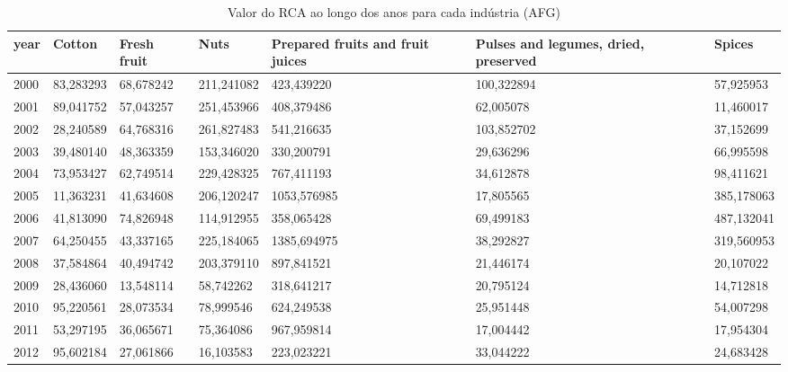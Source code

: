 \begin{table}
\centering
\caption{Valor do RCA ao longo dos anos para cada indústria (AFG)}
\begin{tabular}{p{1cm}p{2cm}p{2cm}p{2cm}p{2cm}p{2cm}p{2cm}}
\toprule
 year &     Cotton &  Fresh fruit &       Nuts &  Prepared fruits and fruit juices &  Pulses and legumes, dried, preserved &     Spices \\
\midrule
 2000 &  83,283293 &    68,678242 & 211,241082 &                        423,439220 &                            100,322894 &  57,925953 \\
 2001 &  89,041752 &    57,043257 & 251,453966 &                        408,379486 &                             62,005078 &  11,460017 \\
 2002 &  28,240589 &    64,768316 & 261,827483 &                        541,216635 &                            103,852702 &  37,152699 \\
 2003 &  39,480140 &    48,363359 & 153,346020 &                        330,200791 &                             29,636296 &  66,995598 \\
 2004 &  73,953427 &    62,749514 & 229,428325 &                        767,411193 &                             34,612878 &  98,411621 \\
 2005 &  11,363231 &    41,634608 & 206,120247 &                       1053,576985 &                             17,805565 & 385,178063 \\
 2006 &  41,813090 &    74,826948 & 114,912955 &                        358,065428 &                             69,499183 & 487,132041 \\
 2007 &  64,250455 &    43,337165 & 225,184065 &                       1385,694975 &                             38,292827 & 319,560953 \\
 2008 &  37,584864 &    40,494742 & 203,379110 &                        897,841521 &                             21,446174 &  20,107022 \\
 2009 &  28,436060 &    13,548114 &  58,742262 &                        318,641217 &                             20,795124 &  14,712818 \\
 2010 &  95,220561 &    28,073534 &  78,999546 &                        624,249538 &                             25,951448 &  54,007298 \\
 2011 &  53,297195 &    36,065671 &  75,364086 &                        967,959814 &                             17,004442 &  17,954304 \\
 2012 &  95,602184 &    27,061866 &  16,103583 &                        223,023221 &                             33,044222 &  24,683428 \\

\end{tabular}
\end{table}
